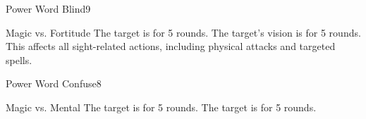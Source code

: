 \begin{spellsection}{Power Word Blind}{9}
    \begin{spellheader}
    \end{spellheader}
    \begin{spellcontent}
        \begin{spelltargetinginfo}
        \end{spelltargetinginfo}
        \begin{spelleffects}
            \begin{spellattack}{Magic vs. Fortitude}
                \spellsuccess The target is \blinded for 5 rounds.
                \spellfailure The target's vision is \impaired for 5 rounds. This affects all sight-related actions, including physical attacks and targeted spells.
            \end{spellattack}
        \end{spelleffects}
    \end{spellcontent}
    \begin{spellfooter}
        \miscastrandom
    \end{spellfooter}
\end{spellsection}

\begin{spellsection}{Power Word Confuse}{8}
    \begin{spellheader}
    \end{spellheader}
    \begin{spellcontent}
        \begin{spelltargetinginfo}
        \end{spelltargetinginfo}
        \begin{spelleffects}
            \begin{spellattack}{Magic vs. Mental}
                \spellsuccess The target is \confused for 5 rounds.
                \spellfailure The target is \disoriented for 5 rounds.
            \end{spellattack}
        \end{spelleffects}
    \end{spellcontent}
    \begin{spellfooter}
        \miscastrandom
    \end{spellfooter}
\end{spellsection}


